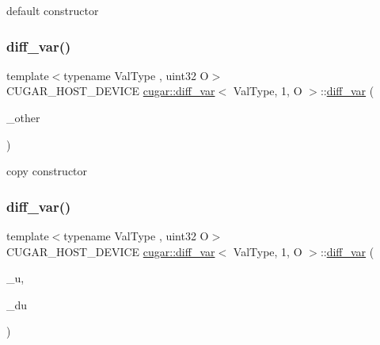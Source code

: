 default constructor \mbox{\label{structcugar_1_1diff__var_3_01_val_type_00_011_00_01_o_01_4_a58a63aab6c19919f07a112ce9cad3632}} 
\subsubsection{\texorpdfstring{diff\+\_\+var()}{diff\_var()}\hspace{0.1cm}{\footnotesize\ttfamily [2/5]}}
{\footnotesize\ttfamily template$<$typename Val\+Type , uint32 O$>$ \\
C\+U\+G\+A\+R\+\_\+\+H\+O\+S\+T\+\_\+\+D\+E\+V\+I\+CE \hyperlink{structcugar_1_1diff__var}{cugar\+::diff\+\_\+var}$<$ Val\+Type, 1, O $>$\+::\hyperlink{structcugar_1_1diff__var}{diff\+\_\+var} (\begin{DoxyParamCaption}\item[{const \hyperlink{structcugar_1_1diff__var}{diff\+\_\+var}$<$ Val\+Type, 1, O $>$ \&}]{\+\_\+other }\end{DoxyParamCaption})\hspace{0.3cm}{\ttfamily [inline]}}

copy constructor \mbox{\label{structcugar_1_1diff__var_3_01_val_type_00_011_00_01_o_01_4_ad37c8d9800fc1e62dfa7d7b418796a17}} 
\subsubsection{\texorpdfstring{diff\+\_\+var()}{diff\_var()}\hspace{0.1cm}{\footnotesize\ttfamily [3/5]}}
{\footnotesize\ttfamily template$<$typename Val\+Type , uint32 O$>$ \\
C\+U\+G\+A\+R\+\_\+\+H\+O\+S\+T\+\_\+\+D\+E\+V\+I\+CE \hyperlink{structcugar_1_1diff__var}{cugar\+::diff\+\_\+var}$<$ Val\+Type, 1, O $>$\+::\hyperlink{structcugar_1_1diff__var}{diff\+\_\+var} (\begin{DoxyParamCaption}\item[{const value\+\_\+type}]{\+\_\+u,  }\item[{const \hyperlink{structcugar_1_1diff__var}{diff\+\_\+type}}]{\+\_\+du }\end{DoxyParamCaption})\hspace{0.3cm}{\ttfamily [inline]}}

